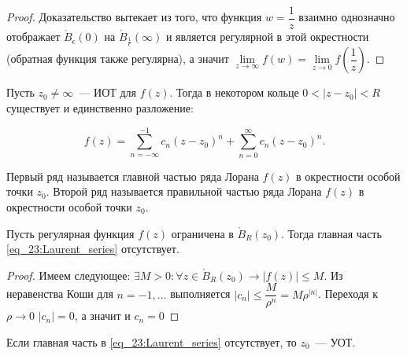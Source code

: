 \begin{proof}
    Доказательство вытекает из того, что функция \(w = \dfrac{1}{z}\) взаимно однозначно отображает
    \(\mathring{B}_\epsilon(0)\) на \(\mathring{B}_{\frac{1}{\epsilon}}(\infty)\) и является
    регулярной в этой окрестности (обратная функция также регулярна), а значит \(\lim\limits_{z
    \rightarrow \infty} f(w) = \lim\limits_{z \rightarrow 0} f\left(\dfrac{1}{z}\right)\).
\end{proof}

Пусть \(z_0 \ne \infty\)~--- ИОТ для \(f(z)\). Тогда в некотором кольце \(0 < |z - z_0| < R\)
существует и единственно разложение:

\begin{equation}
f(z) = \sum\limits_{n = -\infty}^{-1} c_n (z-z_0)^n + \sum\limits_{n=0}^{\infty} c_n (z-z_0)^n.
 \label{eq_23:Laurent_series}
\end{equation}

\begin{definition}
    Первый ряд называется главной частью ряда Лорана \(f(z)\) в окрестности особой точки \(z_0\).
    Второй ряд называется правильной частью ряда Лорана \(f(z)\) в окрестности особой точки \(z_0\).
\end{definition}

\begin{statement} \label{23:principal_part_of_bounded_reg_func}
    Пусть регулярная функция \(f(z)\) ограничена в \(\mathring{B}_R(z_0)\). Тогда главная часть
    \eqref{eq_23:Laurent_series} отсутствует.
\end{statement}

\begin{proof}
    Имеем следующее: \(\exists M > 0 \colon \forall z \in \mathring{B}_R(z_0) \rightarrow |f(z)|
    \le M\). Из неравенства Коши для \(n = -1, \dots\) выполняется \(|c_{n}| \le \dfrac{M}
    {\rho^{n}} = M\rho^{|n|}\). Переходя к \(\rho \rightarrow 0\) \(|c_n| = 0\), а значит и \(c_n
    = 0\)
\end{proof}

\begin{statement} \label{23:sufficient_cond_of_removable_point}
    Если главная часть в \eqref{eq_23:Laurent_series} отсутствует, то \(z_0\)~--- УОТ.
\end{statement}
